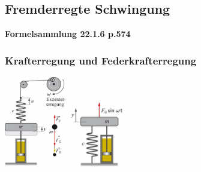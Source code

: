 \subsection{Fremderregte Schwingung}
\textbf{Formelsammlung 22.1.6 p.574}
\subsubsection{Krafterregung und Federkrafterregung}
\begin{center}
	\begin{minipage}{0.3\textwidth}
	\end{minipage}%
	\begin{minipage}{0.2\textwidth}
		\begin{center}
			\includegraphics[height=4cm,keepaspectratio=true]{Images/krafterregung_a.png}
			\includegraphics[height=3cm,keepaspectratio=true]{Images/krafterregung_b.png}
		\end{center}
	\end{minipage}
\end{center}

